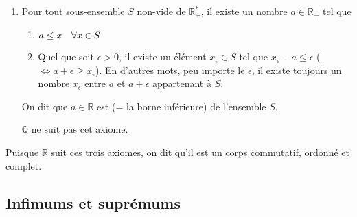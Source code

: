 \documentclass{article}
\begin{document}
{\begin{enumerate}[left=0pt]
          Si $x \leq y$ et $x \neq y$, alors $x < y$. De la même manière, si $x \geq y$ et $x \neq y$, alors $x > y$.

         Cet axiome nous permet d'éliminer $\mathbb{C}$ de la définition. Cependant, $\mathbb{Q}$  est toujours là.

     \item {} Pour tout sous-ensemble $S$ non-vide de $\mathbb{R}^*_+$, il existe un nombre $a \in \mathbb{R}_+$ tel que
         \begin{enumerate}
             \item $a \leq x \quad \forall x \in S$
             \item Quel que soit $\epsilon > 0$, il existe un élément $x_{\epsilon} \in S$ tel que $x_{\epsilon} - a \leq \epsilon$ ($\iff a + \epsilon \geq x_{\epsilon}$). En d'autres mots, peu importe le $\epsilon$, il existe toujours un nombre $x_{\epsilon}$ entre $a$ et $a + \epsilon$ appartenant à $S$.
         \end{enumerate}

         On dit que $a \in \mathbb{R}$ est  (= la borne inférieure) de l'ensemble $S$.

         $\mathbb{Q}$ ne suit pas cet axiome.
   \end{enumerate}

   Puisque $\mathbb{R}$ suit ces trois axiomes, on dit qu'il est un corps commutatif, ordonné et complet.
}

\subsection{Infimums et suprémums}
\end{document}
